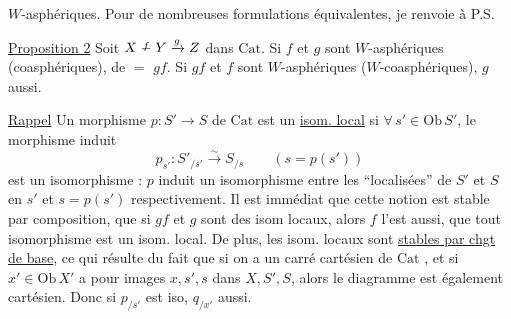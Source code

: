 
$W$-asphériques. Pour de nombreuses   formulations équivalentes, je renvoie à P.S.

\uline{Proposition 2} Soit $X\mathrel{\overset{f}{\relbar}}Y\xrightarrow{g}Z$ dans $\mathrm{Cat}$. Si $f$ et $g$ sont  $W$-asphériques (coasphériques), de $=$ $gf$. Si $gf$ et $f$ sont $W$-asphériques ($W$-coasphériques), $g$ aussi.

 \uline{Rappel} Un morphisme $p:S'\longrightarrow S$ de $\mathrm{Cat}$ est un \uline{isom. local} si $\forall\,s'\in\mathrm{Ob}\,S'$, le morphisme induit \[p_{s'}:S'_{/s'}\xrightarrow{\sim}S_{/s}\qquad(s=p(s'))\] est un isomorphisme : $p$ induit un isomorphisme entre les ``localisées'' de $S'$ et $S$ en $s'$ et $s=p(s')$ respectivement. Il est immédiat que cette notion est stable par composition, que si $gf$ et $g$ sont des isom locaux, alors $f$ l'est aussi, que tout isomorphisme est un isom. local. De plus, les isom. locaux sont \uline{stables par chgt de base}, ce qui résulte du fait  que si on a un carré cartésien de $\mathrm{Cat}$ , et si $x'\in\mathrm{Ob}\,X'$ a pour images $x,s',s$ dans $X,S',S$, alors le diagramme  est également cartésien. Donc si $p_{/s'}$ est iso, $q_{/x'}$ aussi.

